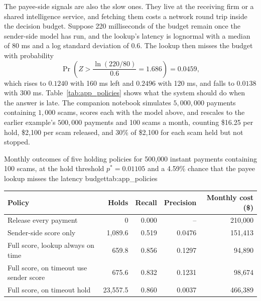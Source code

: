 \documentclass[../ai_in_finance]{subfiles}
\begin{document}
The payee-side signals are also the slow ones. They live at the receiving firm or a shared intelligence service, and fetching them costs a network round trip inside the decision budget. Suppose 220 milliseconds of the budget remain once the sender-side model has run, and the lookup's latency is lognormal with a median of 80 ms and a log standard deviation of $0.6$. The lookup then misses the budget with probability
\begin{equation*}
\Pr\left(Z > \frac{\ln(220/80)}{0.6} = 1.686\right) = 0.0459,
\end{equation*}
which rises to $0.1240$ with 160 ms left and $0.2496$ with 120 ms, and falls to $0.0138$ with 300 ms. Table~\ref{tab:app_policies} shows what the system should do when the answer is late. The companion notebook simulates $5{,}000{,}000$ payments containing $1{,}000$ scams, scores each with the model above, and rescales to the earlier example's $500{,}000$ payments and 100 scams a month, counting \$16.25 per hold, \$2,100 per scam released, and $30\%$ of \$2,100 for each scam held but not stopped.

\begin{booktable}{Monthly outcomes of five holding policies for 500{,}000 instant payments containing 100 scams, at the hold threshold $p^{*}=0.01105$ and a 4.59\% chance that the payee lookup misses the latency budget}{tab:app_policies}
\begin{tabular}{lrrrr}
\toprule
Policy & Holds & Recall & Precision & Monthly cost (\$) \\
\midrule
Release every payment & 0 & 0.000 & -- & 210{,}000 \\
Sender-side score only & 1{,}089.6 & 0.519 & 0.0476 & 151{,}413 \\
Full score, lookup always on time & 659.8 & 0.856 & 0.1297 & 94{,}890 \\
Full score, on timeout use sender score & 675.6 & 0.832 & 0.1231 & 98{,}674 \\
Full score, on timeout hold & 23{,}557.5 & 0.860 & 0.0037 & 466{,}389 \\
\bottomrule
\end{tabular}
\end{booktable}
\end{document}
